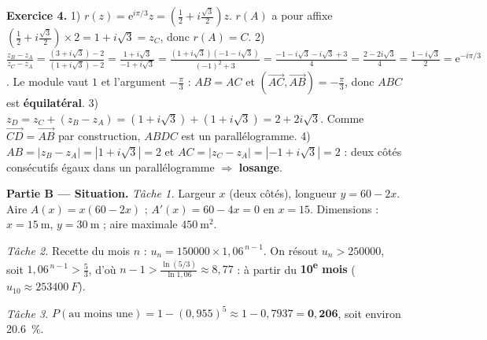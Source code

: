 \noindent\textbf{Exercice 4.}
1) $r(z)=\mathrm e^{i\pi/3}z=(\frac12+i\frac{\sqrt3}{2})z$. $r(A)$ a pour affixe
$(\frac12+i\frac{\sqrt3}{2})\times2=1+i\sqrt3=z_C$, donc $r(A)=C$.
2) $\frac{z_B-z_A}{z_C-z_A}=\frac{(3+i\sqrt3)-2}{(1+i\sqrt3)-2}=\frac{1+i\sqrt3}{-1+i\sqrt3}
=\frac{(1+i\sqrt3)(-1-i\sqrt3)}{(-1)^2+3}=\frac{-1-i\sqrt3-i\sqrt3+3}{4}=\frac{2-2i\sqrt3}{4}=\frac{1-i\sqrt3}{2}=\mathrm e^{-i\pi/3}$.
Le module vaut $1$ et l'argument $-\frac\pi3$ : $AB=AC$ et $(\vec{AC},\vec{AB})=-\frac\pi3$,
donc $ABC$ est \textbf{équilatéral}.
3) $z_D=z_C+(z_B-z_A)=(1+i\sqrt3)+(1+i\sqrt3)=2+2i\sqrt3$. Comme $\vec{CD}=\vec{AB}$
par construction, $ABDC$ est un parallélogramme.
4) $AB=|z_B-z_A|=|1+i\sqrt3|=2$ et $AC=|z_C-z_A|=|-1+i\sqrt3|=2$ : deux côtés consécutifs
égaux dans un parallélogramme $\Rightarrow$ \textbf{losange}.

\smallskip
\noindent\textbf{Partie B — Situation.}
\emph{Tâche 1.} Largeur $x$ (deux côtés), longueur $y=60-2x$. Aire $A(x)=x(60-2x)$ ;
$A'(x)=60-4x=0$ en $x=15$. Dimensions : $x=\SI{15}{\metre}$, $y=\SI{30}{\metre}$ ; aire
maximale $\SI{450}{\metre\squared}$.

\emph{Tâche 2.} Recette du mois $n$ : $u_n=150000\times1{,}06^{\,n-1}$. On résout $u_n>250000$,
soit $1{,}06^{\,n-1}>\frac53$, d'où $n-1>\frac{\ln(5/3)}{\ln1{,}06}\approx8{,}77$ : à partir du
\textbf{10\textsuperscript{e} mois} ($u_{10}\approx\SI{253400}{F}$).

\emph{Tâche 3.} $P(\text{au moins une})=1-(0{,}955)^5\approx1-0{,}7937=\mathbf{0{,}206}$, soit
environ \SI{20,6}{\percent}.
